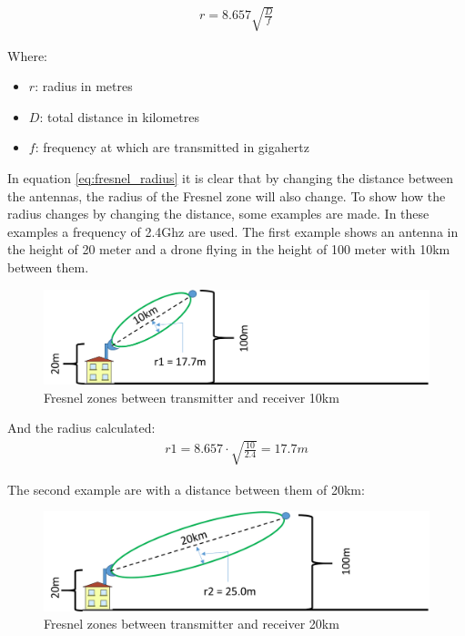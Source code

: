 \begin{align}
r= 8.657 \sqrt{\frac{D}{f}} \label{eq:fresnel_radius}
\end{align}

Where:
\begin{itemize}[label=]
    \item $r$: radius in metres
    \item $D$: total distance in kilometres
    \item $f$: frequency at which are transmitted in gigahertz
\end{itemize}

\noindent In equation \ref{eq:fresnel_radius} it is clear that by changing the distance between the antennas, the radius of the Fresnel zone will also change. To show how the radius changes by changing the distance, some examples are made. In these examples a frequency of 2.4Ghz are used. The first example shows an antenna in the height of 20 meter and a drone flying in the height of 100 meter with 10km between them.

\begin{figure}[H]
	\centering
	\includegraphics[scale=0.50]{figures/fresnel_10km.png}
	\caption{Fresnel zones between transmitter and receiver 10km}
	\label{fig:fresnel_zones_10km}
\end{figure}  

And the radius calculated:
\begin{align*}
r1 = 8.657\cdot \sqrt{\frac{10}{2.4}} = 17.7m
\end{align*}

The second example are with a distance between them of 20km:

\begin{figure}[H]
	\centering
	\includegraphics[scale=0.50]{figures/fresnel_20km.png}
	\caption{Fresnel zones between transmitter and receiver 20km}
	\label{fig:fresnel_zones_20km}
\end{figure}  

